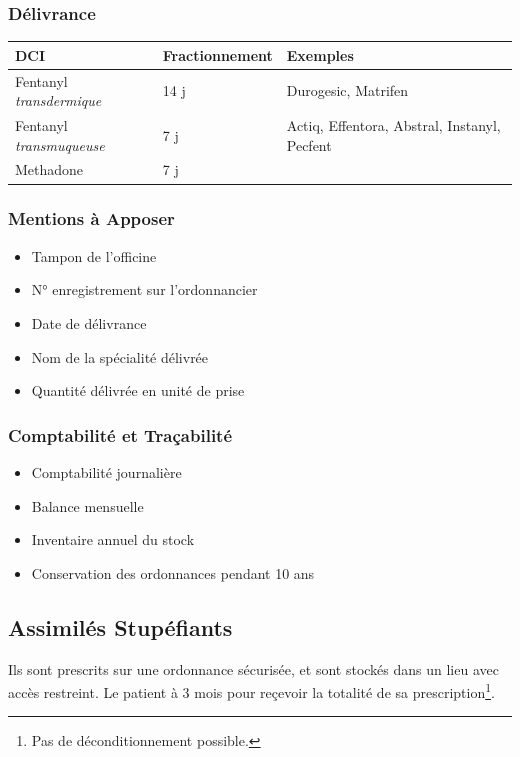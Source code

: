 \documentclass[11pt]{article}
\begin{document}
\subsubsection{Délivrance}
\label{sec:org1da8338}
\begin{center}
\begin{tabular}{lll}
DCI & Fractionnement & Exemples\\
\hline
Fentanyl \emph{transdermique} & 14 j & Durogesic, Matrifen\\
Fentanyl \emph{transmuqueuse} & 7 j & Actiq, Effentora, Abstral, Instanyl, Pecfent\\
Methadone & 7 j & \\
\end{tabular}
\end{center}

\subsubsection{Mentions à Apposer}
\label{sec:orga8f2701}
\begin{itemize}
\item Tampon de l'officine
\item N° enregistrement sur l'ordonnancier
\item Date de délivrance
\item Nom de la spécialité délivrée
\item Quantité délivrée en unité de prise
\end{itemize}

\subsubsection{Comptabilité et Traçabilité}
\label{sec:orgc193b64}
\begin{itemize}
\item Comptabilité journalière
\item Balance mensuelle
\item Inventaire annuel du stock
\item Conservation des ordonnances pendant 10 ans
\end{itemize}

\subsection{Assimilés Stupéfiants}
\label{sec:org881da0c}
Ils sont prescrits sur une ordonnance sécurisée, et sont stockés dans un lieu avec accès restreint.
Le patient à 3 mois pour reçevoir la totalité de sa prescription\footnote{Pas de déconditionnement possible.}.
\end{document}
